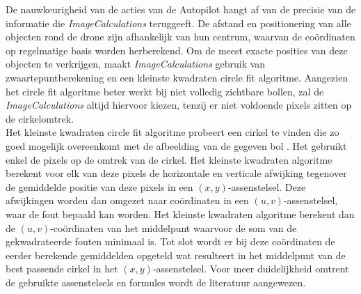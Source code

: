 \noindent
De nauwkeurigheid van de acties van de Autopilot hangt af van de precisie van de informatie die \textit{ImageCalculations} teruggeeft. De afstand en positionering van alle objecten rond de drone zijn afhankelijk van hun centrum, waarvan de co\"ordinaten op regelmatige basis worden herberekend. Om de meest exacte posities van deze objecten te verkrijgen, maakt \textit{ImageCalculations} gebruik van zwaartepuntberekening en een kleinste kwadraten circle fit algoritme. Aangezien het circle fit algoritme beter werkt bij niet volledig zichtbare bollen, zal de \textit{ImageCalculations} altijd hiervoor kiezen, tenzij er niet voldoende pixels zitten op de cirkelomtrek.
\\
Het kleinste kwadraten circle fit algoritme probeert een cirkel te vinden die zo goed mogelijk overeenkomt met de afbeelding van de gegeven bol \cite{website:kleinsteKwadraten}. Het gebruikt enkel de pixels op de omtrek van de cirkel. Het kleinste kwadraten algoritme berekent voor elk van deze pixels de horizontale en verticale afwijking tegenover de gemiddelde positie van deze pixels in een \((x,y)\)-assenstelsel. Deze afwijkingen worden dan omgezet naar co\"ordinaten in een \((u,v)\)-assenstelsel, waar de fout bepaald kan worden. Het kleinste kwadraten algoritme berekent dan de \((u,v)\)-co\"ordinaten van het middelpunt waarvoor de som van de gekwadrateerde fouten minimaal is. Tot slot wordt er bij deze co\"ordinaten de eerder berekende gemiddelden opgeteld wat resulteert in het middelpunt van de best passende cirkel in het \((x,y)\)-assenstelsel. Voor meer duidelijkheid omtrent de gebruikte assenstelsels en formules wordt de literatuur \cite{website:kleinsteKwadraten} aangewezen. 
